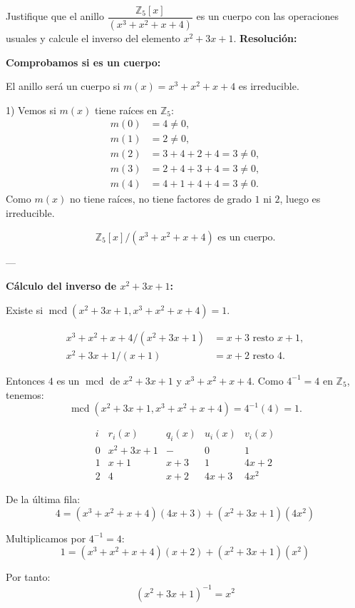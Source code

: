 \documentclass[a4paper,12pt]{article}
\begin{document}
\begin{ejercicio}[title=Ejercicio 57]
Justifique que el anillo $\dfrac{\mathbb{Z}_5[x]}{(x^3 + x^2 + x + 4)}$ es un cuerpo con las operaciones usuales y calcule el inverso del elemento $x^2 + 3x + 1$.
\tcblower
\textbf{Resolución:}

\textbf{Comprobamos si es un cuerpo:}

El anillo será un cuerpo si $m(x) = x^3 + x^2 + x + 4$ es irreducible.

1) Vemos si $m(x)$ tiene raíces en $\mathbb{Z}_5$:
\[
\begin{aligned}
m(0) &= 4 \neq 0, \\
m(1) &= 2 \neq 0, \\
m(2) &= 3 + 4 + 2 + 4 = 3 \neq 0, \\
m(3) &= 2 + 4 + 3 + 4 = 3 \neq 0, \\
m(4) &= 4 + 1 + 4 + 4 = 3 \neq 0.
\end{aligned}
\]
Como $m(x)$ no tiene raíces, no tiene factores de grado $1$ ni $2$, luego es irreducible.

\[
\boxed{\mathbb{Z}_5[x]/(x^3 + x^2 + x + 4) \text{ es un cuerpo.}}
\]

---

\textbf{Cálculo del inverso de $x^2 + 3x + 1$:}

Existe si $\operatorname{mcd}(x^2 + 3x + 1, x^3 + x^2 + x + 4) = 1$.

\[
\begin{aligned}
x^3 + x^2 + x + 4 / (x^2 + 3x + 1) &= x + 3 \text{ resto } x + 1, \\
x^2 + 3x + 1 / (x + 1) &= x + 2 \text{ resto } \boxed{4}.
\end{aligned}
\]

Entonces $4$ es un $\operatorname{mcd}$ de $x^2 + 3x + 1$ y $x^3 + x^2 + x + 4$.  
Como $4^{-1} = 4$ en $\mathbb{Z}_5$, tenemos:
\[
\operatorname{mcd}(x^2 + 3x + 1, x^3 + x^2 + x + 4) = 4^{-1}(4) = 1.
\]

\[
\begin{array}{c|c|c|c|c}
i & r_i(x) & q_i(x) & u_i(x) & v_i(x) \\ \hline
0 & x^2 + 3x + 1 & - & 0 & 1 \\
1 & x + 1 & x + 3 & 1 & 4x + 2 \\
2 & \boxed{4} & x + 2 & 4x + 3 & 4x^2
\end{array}
\]

De la última fila:
\[
\boxed{4} = (x^3 + x^2 + x + 4)(4x + 3) + (x^2 + 3x + 1)(4x^2)
\]

Multiplicamos por $4^{-1} = 4$:
\[
1 = (x^3 + x^2 + x + 4)(x + 2) + (x^2 + 3x + 1)(x^2)
\]

Por tanto:
\[
\boxed{(x^2 + 3x + 1)^{-1} = x^2}
\]
\end{ejercicio}
\end{document}

